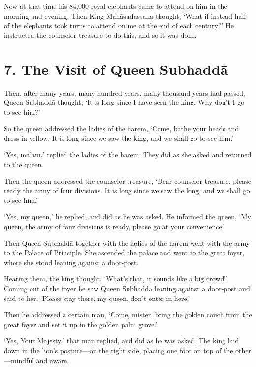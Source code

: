\documentclass[12pt,openany]{book}%
\begin{document}
Now at that time his 84,000 royal elephants came to attend on him in the morning and evening. Then King \textsanskrit{Mahāsudassana} thought, ‘What if instead half of the elephants took turns to attend on me at the end of each century?’ He instructed the counselor-treasure to do this, and so it was done. 

\section*{7. The Visit of Queen \textsanskrit{Subhaddā} }

Then, after many years, many hundred years, many thousand years had passed, Queen \textsanskrit{Subhaddā} thought, ‘It is long since I have seen the king. Why don’t I go to see him?’ 

So the queen addressed the ladies of the harem, ‘Come, bathe your heads and dress in yellow. It is long since we saw the king, and we shall go to see him.’ 

‘Yes, ma’am,’ replied the ladies of the harem. They did as she asked and returned to the queen. 

Then the queen addressed the counselor-treasure, ‘Dear counselor-treasure, please ready the army of four divisions. It is long since we saw the king, and we shall go to see him.’ 

‘Yes, my queen,’ he replied, and did as he was asked. He informed the queen, ‘My queen, the army of four divisions is ready, please go at your convenience.’ 

Then Queen \textsanskrit{Subhaddā} together with the ladies of the harem went with the army to the Palace of Principle. She ascended the palace and went to the great foyer, where she stood leaning against a door-post. 

Hearing them, the king thought, ‘What’s that, it sounds like a big crowd!’ Coming out of the foyer he saw Queen \textsanskrit{Subhaddā} leaning against a door-post and said to her, ‘Please stay there, my queen, don’t enter in here.’ 

Then he addressed a certain man, ‘Come, mister, bring the golden couch from the great foyer and set it up in the golden palm grove.’ 

‘Yes, Your Majesty,’ that man replied, and did as he was asked. The king laid down in the lion’s posture—on the right side, placing one foot on top of the other—mindful and aware. 
\end{document}
